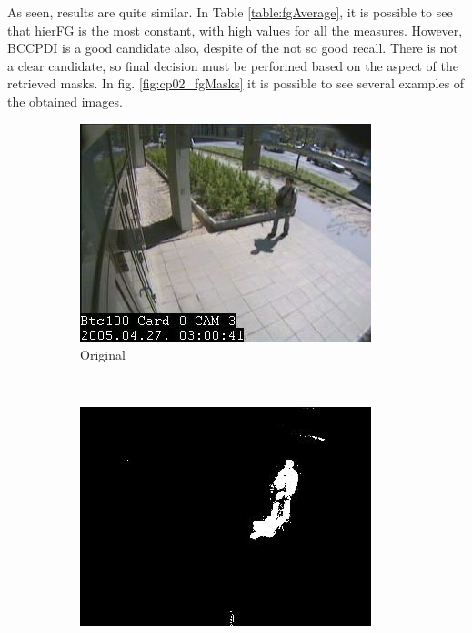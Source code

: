As seen, results are quite similar. In Table \ref{table:fgAverage}, it is possible to see that hierFG is the most 
constant, with high values for all the measures. However, BCCPDI is a good candidate also, despite of the not so good 
recall. There is not a clear candidate, so final decision must be performed based on the aspect of the retrieved masks. 
In fig. \ref{fig:cp02_fgMasks} it is possible to see several examples of the obtained images.

\begin{figure}
        \centering
        \begin{subfigure}[b]{0.19\textwidth}
                \centering
                \includegraphics[width=\textwidth]{fig13.jpg}
                \caption{Original}
                \label{fig:cp02_originalMask}
        \end{subfigure}%
        ~ %
        \begin{subfigure}[b]{0.19\textwidth}
                \centering
                \includegraphics[width=\textwidth]{fig14.jpg}

\end{subfigure}
\end{figure}
